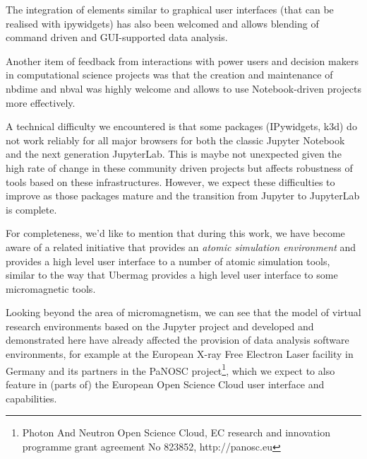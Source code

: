 \documentclass{deliverablereport}
\begin{document}
The integration of elements similar to graphical user interfaces (that
can be realised with ipywidgets) has also been welcomed and allows
blending of command driven and GUI-supported data analysis.

Another item of feedback from interactions with power users and
decision makers in computational science projects was that the
creation and maintenance of nbdime and nbval was highly welcome and
allows to use Notebook-driven projects more effectively.

A technical difficulty we encountered is that some packages
(IPywidgets, k3d) do not work reliably for all major browsers for both
the classic Jupyter Notebook and the next generation JupyterLab. This
is maybe not unexpected given the high rate of change in these
community driven projects but affects robustness of tools based on
these infrastructures. However, we expect these difficulties to
improve as those packages mature and the transition from Jupyter to
JupyterLab is complete.

For completeness, we'd like to mention that during this work, we have
become aware of a related initiative\cite{ase-paper} that provides an
\emph{atomic simulation environment} and provides a high level user
interface to a number of atomic simulation tools, similar to the way
that Ubermag provides a high level user interface to some
micromagnetic tools.

Looking beyond the area of micromagnetism, we can see that the model
of virtual research environments based on the Jupyter project and
developed and demonstrated here have already affected the provision of
data analysis software environments, for example at the European X-ray
Free Electron Laser facility in Germany and its partners in the PaNOSC
project\footnote{Photon And Neutron Open Science Cloud, EC research
  and innovation programme grant agreement No 823852,
  http://panosc.eu}, which we expect to also feature in (parts of) the
European Open Science Cloud user interface and capabilities.

\newpage\printbibliography
\end{document}
